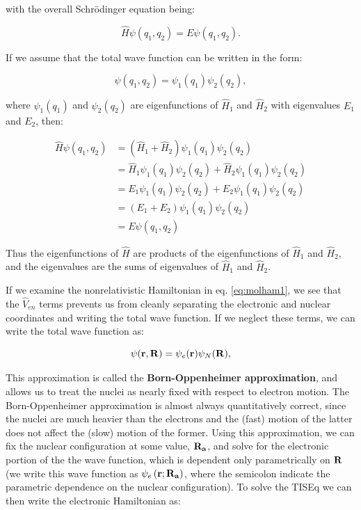 \documentclass[
  9pt,
]{extbook}
\theoremstyle{definition}
\theoremstyle{definition}
\theoremstyle{definition}
\theoremstyle{remark}
\begin{document}
with the overall Schrödinger equation being:

\begin{equation}
\hat{H} \psi(q_1, q_2) = E \psi(q_1, q_2).
\label{eq:molham4}
\end{equation}

If we assume that the total wave function can be written in the form:

\begin{equation}
\psi(q_1, q_2) = \psi_1(q_1) \psi_2(q_2),
\label{eq:molham5}
\end{equation}

where \(\psi_1(q_1)\) and \(\psi_2(q_2)\) are eigenfunctions of \(\hat{H}_1\) and \(\hat{H}_2\) with eigenvalues \(E_1\) and \(E_2\), then:

\begin{equation}
\begin{aligned}
\displaystyle \hat{H} \psi(q_1, q_2) &= ( \hat{H}_1 + \hat{H}_2 ) \psi_1(q_1) \psi_2(q_2) \\
 	&= \hat{H}_1 \psi_1(q_1) \psi_2(q_2) + \hat{H}_2 \psi_1(q_1) \psi_2(q_2) \\
 	&= E_1 \psi_1(q_1) \psi_2(q_2) + E_2 \psi_1(q_1) \psi_2(q_2) \\
 	&= (E_1 + E_2) \psi_1(q_1) \psi_2(q_2) \\
 	&= E \psi(q_1, q_2)
\end{aligned}
\label{eq:molham6}
\end{equation}

Thus the eigenfunctions of \(\hat{H}\) are products of the eigenfunctions of \(\hat{H}_1\) and \(\hat{H}_2\), and the eigenvalues are the sums of eigenvalues of \(\hat{H}_1\) and \(\hat{H}_2\).

If we examine the nonrelativistic Hamiltonian in eq. \eqref{eq:molham1}, we see that the \(\hat{V}_{en}\) terms prevents us from cleanly separating the electronic and nuclear coordinates and writing the total wave function. If we neglect these terms, we can write the total wave function as:

\begin{equation}
\psi({\bf r}, {\bf R}) = \psi_e({\bf r}) \psi_N({\bf R}),
\label{eq:molham7}
\end{equation}

This approximation is called the \textbf{Born-Oppenheimer approximation}, and allows us to treat the nuclei as nearly fixed with respect to electron motion. The Born-Oppenheimer approximation is almost always quantitatively correct, since the nuclei are much heavier than the electrons and the (fast) motion of the latter does not affect the (slow) motion of the former. Using this approximation, we can fix the nuclear configuration at some value, \({\bf R_a}\), and solve for the electronic portion of the the wave function, which is dependent only parametrically on \({\bf R}\) (we write this wave function as \(\psi_e \left({\bf r}; {\bf R_a} \right)\), where the semicolon indicate the parametric dependence on the nuclear configuration). To solve the TISEq we can then write the electronic Hamiltonian as:
\end{document}
